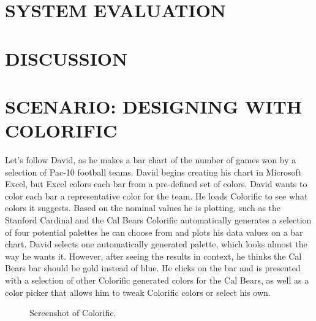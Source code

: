 \documentclass{chi2011}
\newcommand{\system}{Colorific\xspace}
\begin{document}
\section{SYSTEM EVALUATION}

\section{DISCUSSION}

\section{SCENARIO: DESIGNING WITH COLORIFIC}
Let's follow David, as he makes a bar chart of the number of games won by a selection of Pac-10 football teams. 
David begins creating his chart in Microsoft Excel, but Excel colors each bar from a pre-defined set of colors. David wants to color each bar a representative color for the team. He loads \system to see what colors it suggests. Based on the nominal values he is plotting, such as the Stanford Cardinal and the Cal Bears \system automatically generates a selection of four potential palettes he can choose from and plots his data values on a bar chart. David selects one automatically generated palette, which looks almost the way he wants it. However, after seeing the results in context, he thinks the Cal Bears bar should be gold instead of blue. He clicks on the bar and is presented with a selection of other \system generated colors for the Cal Bears, as well as a color picker that allows him to tweak \system colors or select his own. 

\begin{figure}[htb]
\label{screenshot}
\caption{Screenshot of \system.}
\end{figure}
\end{document}
